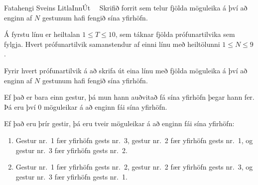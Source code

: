 \begin{problem}{Fatahengi Sveins Litla}{Inn}{Út}{~}{~}
	Skrifið forrit sem telur fjölda möguleika á því að enginn af $N$ gestunum hafi fengið sína yfirhöfn.

	\Input

		Á fyrstu línu er heiltalan $1 \leq T \leq 10$, sem táknar fjölda prófunartilvika sem fylgja. Hvert prófunartilvik samanstendur af einni línu með heiltölunni $1 \leq N \leq 9$.

	\Output

		Fyrir hvert prófunartilvik á að skrifa út eina línu með fjölda möguleika á því að enginn af $N$ gestunum hafi fengið sína yfirhöfn.

	\Examples

		\begin{example}
		\end{example}

	\Explanation

		Ef það er bara einn gestur, þá mun hann auðvitað fá sína yfirhöfn þegar hann fer. Þá eru því 0 möguleikar á að enginn fái sína yfirhöfn.

Ef það eru þrír gestir, þá eru tveir möguleikar á að enginn fái sína yfirhöfn:
	
	\begin{enumerate}
		\item Gestur nr.\ 1 fær yfirhöfn gests nr.\ 3, gestur nr.\ 2 fær yfirhöfn gests nr.\ 1, og gestur nr.\ 3 fær yfirhöfn gests nr.\ 2.
		\item Gestur nr.\ 1 fær yfirhöfn gests nr.\ 2, gestur nr.\ 2 fær yfirhöfn gests nr.\ 3, og gestur nr.\ 3 fær yfirhöfn gests nr.\ 1.
	\end{enumerate}

\end{problem}